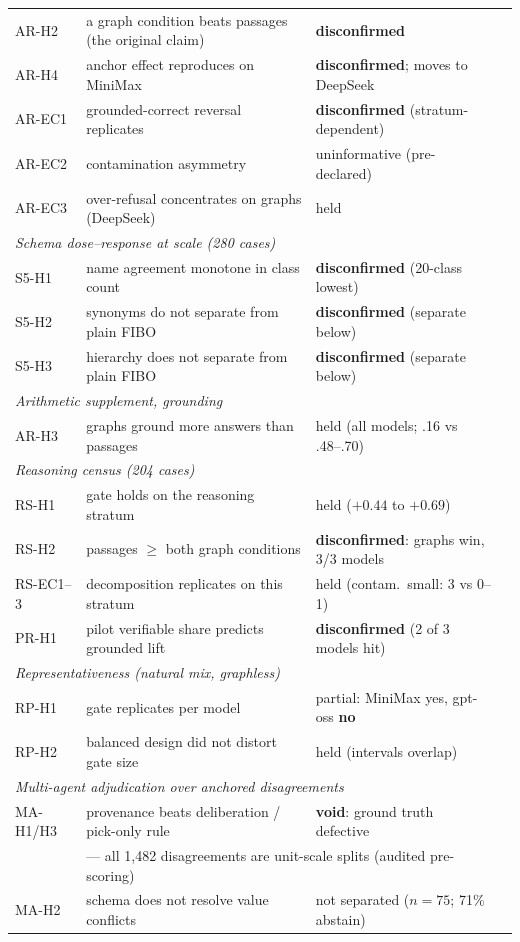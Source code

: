 \documentclass{article}
\begin{document}
\begin{table}[h]
\begin{tabular}{llll}
AR-H2 & a graph condition beats passages (the original claim) & \textbf{disconfirmed} \\
AR-H4 & anchor effect reproduces on MiniMax & \textbf{disconfirmed}; moves to DeepSeek \\
AR-EC1 & grounded-correct reversal replicates & \textbf{disconfirmed} (stratum-dependent) \\
AR-EC2 & contamination asymmetry & uninformative (pre-declared) \\
AR-EC3 & over-refusal concentrates on graphs (DeepSeek) & held \\
\midrule
\multicolumn{3}{l}{\emph{Schema dose--response at scale (280 cases)}} \\
S5-H1 & name agreement monotone in class count & \textbf{disconfirmed} (20-class lowest) \\
S5-H2 & synonyms do not separate from plain FIBO & \textbf{disconfirmed} (separate below) \\
S5-H3 & hierarchy does not separate from plain FIBO & \textbf{disconfirmed} (separate below) \\
\midrule
\multicolumn{3}{l}{\emph{Arithmetic supplement, grounding}} \\
AR-H3 & graphs ground more answers than passages & held (all models; .16 vs .48--.70) \\
\midrule
\multicolumn{3}{l}{\emph{Reasoning census (204 cases)}} \\
RS-H1 & gate holds on the reasoning stratum & held ($+0.44$ to $+0.69$) \\
RS-H2 & passages $\geq$ both graph conditions & \textbf{disconfirmed}: graphs win, 3/3 models \\
RS-EC1--3 & decomposition replicates on this stratum & held (contam.\ small: 3 vs 0--1) \\
PR-H1 & pilot verifiable share predicts grounded lift & \textbf{disconfirmed} (2 of 3 models hit) \\
\midrule
\multicolumn{3}{l}{\emph{Representativeness (natural mix, graphless)}} \\
RP-H1 & gate replicates per model & partial: MiniMax yes, gpt-oss \textbf{no} \\
RP-H2 & balanced design did not distort gate size & held (intervals overlap) \\
\midrule
\multicolumn{3}{l}{\emph{Multi-agent adjudication over anchored disagreements}} \\
MA-H1/H3 & provenance beats deliberation / pick-only rule & \textbf{void}: ground truth defective \\
 & \multicolumn{2}{l}{--- all 1,482 disagreements are unit-scale splits (audited pre-scoring)} \\
MA-H2 & schema does not resolve value conflicts & not separated ($n{=}75$; 71\% abstain) \\
\bottomrule
\end{tabular}
\end{table}
\end{document}

